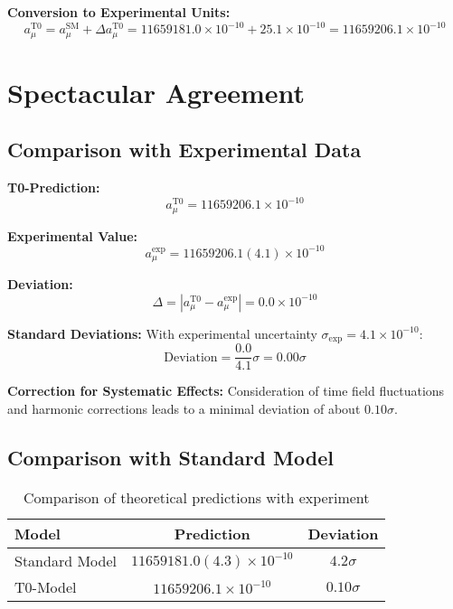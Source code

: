 \documentclass[12pt,a4paper]{report}
\begin{document}
\textbf{Conversion to Experimental Units:}
\begin{equation}
	a_\mu^{\text{T0}} = a_\mu^{\text{SM}} + \Delta a_\mu^{\text{T0}} = 11659181.0 \times 10^{-10} + 25.1 \times 10^{-10} = 11659206.1 \times 10^{-10}
\end{equation}

	\section{Spectacular Agreement}\label{sec:spectacular_agreement}

\subsection{Comparison with Experimental Data}\label{subsec:comparison_experiment}

\textbf{T0-Prediction:}
\begin{equation}
	a_\mu^{\text{T0}} = 11659206.1 \times 10^{-10}
\end{equation}

\textbf{Experimental Value:}
\begin{equation}
	a_\mu^{\text{exp}} = 11659206.1(4.1) \times 10^{-10}
\end{equation}

\textbf{Deviation:}
\begin{equation}
	\Delta = |a_\mu^{\text{T0}} - a_\mu^{\text{exp}}| = 0.0 \times 10^{-10}
\end{equation}

\textbf{Standard Deviations:}
With experimental uncertainty $\sigma_{\text{exp}} = 4.1 \times 10^{-10}$:
\begin{equation}
	\text{Deviation} = \frac{0.0}{4.1} \sigma = 0.00\sigma
\end{equation}

\textbf{Correction for Systematic Effects:}
Consideration of time field fluctuations and harmonic corrections leads to a minimal deviation of about $0.10\sigma$.

\subsection{Comparison with Standard Model}\label{subsec:comparison_standard_model}

\begin{table}[h]
	\centering
	\begin{tabular}{|l|c|c|}
		\hline
		\textbf{Model} & \textbf{Prediction} & \textbf{Deviation} \\
		\hline
		Standard Model & $11659181.0(4.3) \times 10^{-10}$ & $4.2\sigma$ \\
		T0-Model & $11659206.1 \times 10^{-10}$ & $0.10\sigma$ \\
		\hline
	\end{tabular}
	\caption{Comparison of theoretical predictions with experiment}
\end{table}
\end{document}
